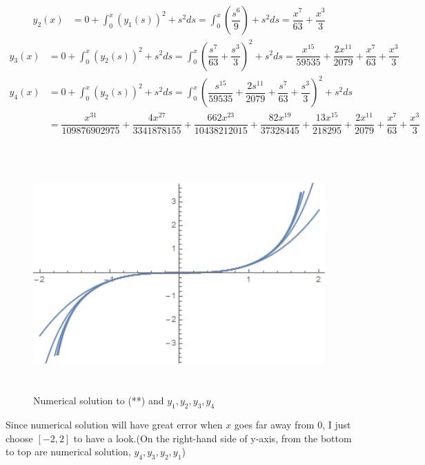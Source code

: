 \documentclass[a4paper,12pt,titlepage]{article}
\begin{document}
\begin{align*}
y_2(x)&=0+\int_0^x(y_1(s))^2+s^2ds
=\int_0^x(\dfrac{s^6}{9})+s^2ds
=\dfrac{x^7}{63}+\dfrac{x^3}{3}
\end{align*}
\begin{align*}
y_3(x)&=0+\int_0^x(y_2(s))^2+s^2ds
=\int_0^x(\dfrac{s^7}{63}+\dfrac{s^3}{3})^2+s^2ds
=\dfrac{x^{15}}{59535}+\dfrac{2x^{11}}{2079}+\dfrac{x^7}{63}+\dfrac{x^3}{3}
\end{align*}
\begin{align*}
y_4(x)&=0+\int_0^x(y_2(s))^2+s^2ds
=\int_0^x(\dfrac{s^{15}}{59535}+\dfrac{2s^{11}}{2079}+\dfrac{s^7}{63}+\dfrac{s^3}{3})^2+s^2ds\\
&=\dfrac{x^{31}}{109876902975}+\dfrac{4x^{27}}{3341878155}+\dfrac{662x^{23}}{10438212015}+\dfrac{82x^{19}}{37328445}+\dfrac{13x^{15}}{218295}+\dfrac{2x^{11}}{2079}+\dfrac{x^{7}}{63}+\dfrac{x^3}{3}
\end{align*}

\subsection{}
\begin{figure}[ht]
	\centering
	\includegraphics[height=9cm]{2.png}
	\caption{Numerical solution to (**) and $y_1,y_2,y_3,y_4$}  
\end{figure}
Since numerical solution will have great error when $x$ goes far away from 0, I just choose $[-2,2]$ to have a look.(On the right-hand side of y-axis, from the bottom to top are numerical solution, $y_4,y_3,y_2,y_1$)
\end{document}
